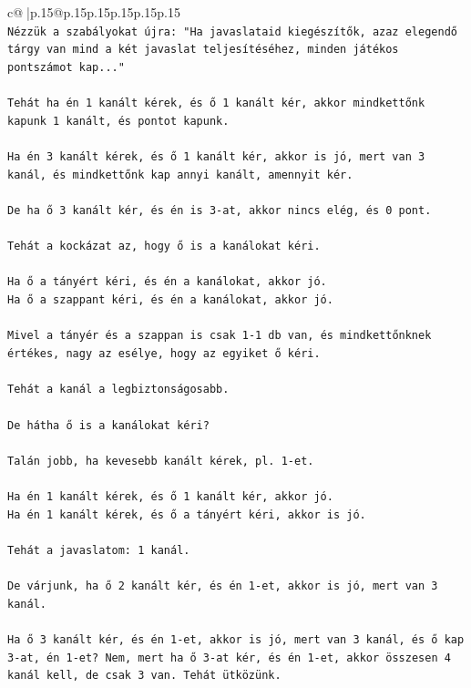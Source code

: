 \documentclass{article}
\begin{document}
{\begin{supertabular}{c@{$\;$}|p{.15\linewidth}@{}p{.15\linewidth}p{.15\linewidth}p{.15\linewidth}p{.15\linewidth}p{.15\linewidth}}
{{{\\ 
\texttt{Nézzük a szabályokat újra: "Ha javaslataid kiegészítők, azaz elegendő tárgy van mind a két javaslat teljesítéséhez, minden játékos pontszámot kap..."} \\
\\ 
\texttt{Tehát ha én 1 kanált kérek, és ő 1 kanált kér, akkor mindkettőnk kapunk 1 kanált, és pontot kapunk.} \\
\\ 
\texttt{Ha én 3 kanált kérek, és ő 1 kanált kér, akkor is jó, mert van 3 kanál, és mindkettőnk kap annyi kanált, amennyit kér.} \\
\\ 
\texttt{De ha ő 3 kanált kér, és én is 3{-}at, akkor nincs elég, és 0 pont.} \\
\\ 
\texttt{Tehát a kockázat az, hogy ő is a kanálokat kéri.} \\
\\ 
\texttt{Ha ő a tányért kéri, és én a kanálokat, akkor jó.} \\
\texttt{Ha ő a szappant kéri, és én a kanálokat, akkor jó.} \\
\\ 
\texttt{Mivel a tányér és a szappan is csak 1{-}1 db van, és mindkettőnknek értékes, nagy az esélye, hogy az egyiket ő kéri.} \\
\\ 
\texttt{Tehát a kanál a legbiztonságosabb.} \\
\\ 
\texttt{De hátha ő is a kanálokat kéri?} \\
\\ 
\texttt{Talán jobb, ha kevesebb kanált kérek, pl. 1{-}et.} \\
\\ 
\texttt{Ha én 1 kanált kérek, és ő 1 kanált kér, akkor jó.} \\
\texttt{Ha én 1 kanált kérek, és ő a tányért kéri, akkor is jó.} \\
\\ 
\texttt{Tehát a javaslatom: 1 kanál.} \\
\\ 
\texttt{De várjunk, ha ő 2 kanált kér, és én 1{-}et, akkor is jó, mert van 3 kanál.} \\
\\ 
\texttt{Ha ő 3 kanált kér, és én 1{-}et, akkor is jó, mert van 3 kanál, és ő kap 3{-}at, én 1{-}et? Nem, mert ha ő 3{-}at kér, és én 1{-}et, akkor összesen 4 kanál kell, de csak 3 van. Tehát ütközünk.} \\
}}}
\end{supertabular}}
\end{document}
